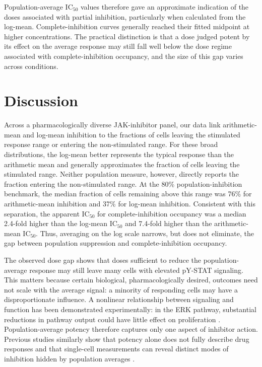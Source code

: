 \documentclass[11pt]{article}
\newcommand{\icfifty}{IC$_{50}$}
\begin{document}
Population-average \icfifty{} values therefore gave an approximate indication of the doses associated with partial inhibition, particularly when calculated from the log-mean. Complete-inhibition curves generally reached their fitted midpoint at higher concentrations. The practical distinction is that a dose judged potent by its effect on the average response may still fall well below the dose regime associated with complete-inhibition occupancy, and the size of this gap varies across conditions.
\section*{Discussion}
Across a pharmacologically diverse JAK-inhibitor panel, our data link arithmetic-mean and log-mean inhibition to the fractions of cells leaving the stimulated response range or entering the non-stimulated range. For these broad distributions, the log-mean better represents the typical response than the arithmetic mean and generally approximates the fraction of cells leaving the stimulated range. Neither population measure, however, directly reports the fraction entering the non-stimulated range. At the 80\% population-inhibition benchmark, the median fraction of cells remaining above this range was 76\% for arithmetic-mean inhibition and 37\% for log-mean inhibition. Consistent with this separation, the apparent \icfifty{} for complete-inhibition occupancy was a median 2.4-fold higher than the log-mean \icfifty{} and 7.4-fold higher than the arithmetic-mean \icfifty{}. Thus, averaging on the log scale narrows, but does not eliminate, the gap between population suppression and complete-inhibition occupancy.


The observed dose gap shows that doses sufficient to reduce the population-average response may still leave many cells with elevated pY-STAT signaling. This matters because certain biological, pharmacologically desired, outcomes need not scale with the average signal: a minority of responding cells may have a disproportionate influence. A nonlinear relationship between signaling and function has been demonstrated experimentally: in the ERK pathway, substantial reductions in pathway output could have little effect on proliferation \citep{albeck2013frequency}. Population-average potency therefore captures only one aspect of inhibitor action. Previous studies similarly show that potency alone does not fully describe drug responses and that single-cell measurements can reveal distinct modes of inhibition hidden by population averages \citep{fallahi2013metrics,vogel2016dichotomy,kinnunen2024characterizing}.
\end{document}
